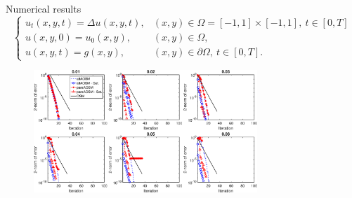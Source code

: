 \documentclass{beamer}
\begin{document}
\begin{frame}{Numerical results}
\begin{equation*}
	\begin{cases} u_t(x,y,t) = \Delta u(x,y,t), & (x,y) \in \Omega = [-1,1] \times [-1,1], \ t \in [0,T] \\
		u(x,y,0) = u_0(x,y), & (x,y) \in \Omega, \\
		u(x,y,t) = g(x,y), & (x,y) \in \partial \Omega, \ t \in [0,T]. \end{cases}
\end{equation*}
\begin{figure}
	\includegraphics[width=0.75\textwidth]{AOSM/PLOT_AOSMConv_Heat_v1.pdf}
	\label{fig: heat 1}
\end{figure}
\end{frame}
\end{document}
